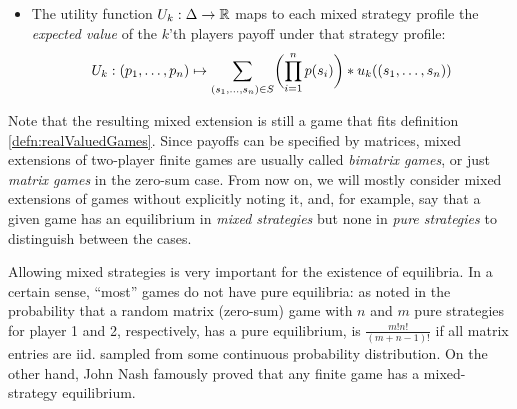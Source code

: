 \documentclass[a4paper]{scrreprt}
\begin{document}
\begin{defn}
\begin{itemize}
            \item
            The utility function $U_k: \Delta \to \mathbb{R}$ maps to each mixed strategy profile the \emph{expected value} of the $k$'th players payoff under that strategy profile:
            \begin{gather}
                U_k: 
                (p_1, \dots, p_n) 
                \mapsto
                \sum_{(s_1, \dots, s_n) \in S} \biggl(\prod_{i=1}^{n} p(s_i)\biggr) * u_k( (s_1, \dots, s_n) )
                \label{eq:mixedStrategyUtility}
            \end{gather}
        \end{itemize}
    \end{defn}
    
    Note that the resulting mixed extension is still a game that fits definition \ref{defn:realValuedGames}.
    Since payoffs can be specified by matrices, mixed extensions of two-player finite %
    games are usually called \emph{bimatrix games}, or just \emph{matrix games} in the zero-sum case.
    From now on, we will mostly consider mixed extensions of games without explicitly noting it, and, for example, say that a given game has an equilibrium in \emph{mixed strategies} but none in \emph{pure strategies} to distinguish between the cases.
    
    Allowing mixed strategies is very important for the existence of equilibria. In a certain sense, “most” games do not have pure equilibria: as noted in \cite{bib:matsumotoGameTheory} %
    the probability that a random matrix (zero-sum) game with $n$ and $m$ pure strategies for player 1 and 2, respectively, has a pure equilibrium, is $\frac{m! n!}{(m+n-1)!}$ if all matrix entries are iid. 
    sampled from some continuous probability distribution. On the other hand, John Nash %
    famously proved that any finite game has a mixed-strategy equilibrium. 
    
    
    
\end{document}
